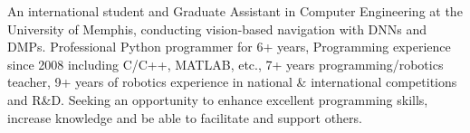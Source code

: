 
\begin{cvparagraph}
An international student and Graduate Assistant in Computer Engineering at the University of Memphis, conducting vision-based navigation with DNNs and DMPs. Professional Python programmer for 6+ years, Programming experience since 2008 including C/C++, MATLAB, etc., 7+ years programming/robotics teacher, 9+ years of robotics experience in national \& international competitions and R\&D. Seeking an opportunity to enhance excellent programming skills, increase knowledge and be able to facilitate and support others. 
\end{cvparagraph}